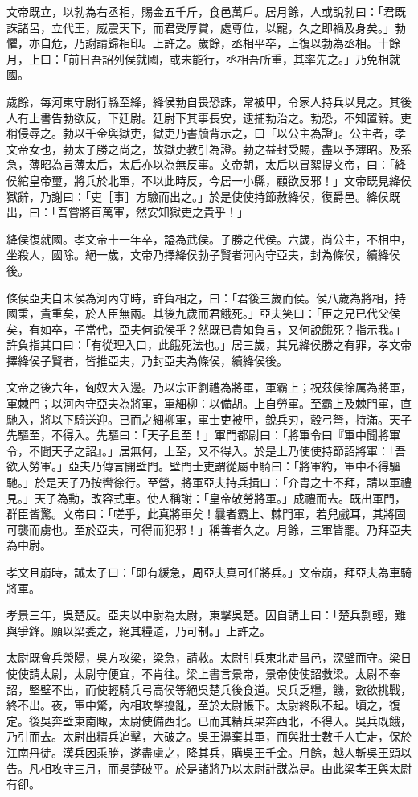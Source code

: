 \begin{pinyinscope}
文帝既立，以勃為右丞相，賜金五千斤，食邑萬戶。居月餘，人或說勃曰：「君既誅諸呂，立代王，威震天下，而君受厚賞，處尊位，以寵，久之即禍及身矣。」勃懼，亦自危，乃謝請歸相印。上許之。歲餘，丞相平卒，上復以勃為丞相。十餘月，上曰：「前日吾詔列侯就國，或未能行，丞相吾所重，其率先之。」乃免相就國。

歲餘，每河東守尉行縣至絳，絳侯勃自畏恐誅，常被甲，令家人持兵以見之。其後人有上書告勃欲反，下廷尉。廷尉下其事長安，逮捕勃治之。勃恐，不知置辭。吏稍侵辱之。勃以千金與獄吏，獄吏乃書牘背示之，曰「以公主為證」。公主者，孝文帝女也，勃太子勝之尚之，故獄吏教引為證。勃之益封受賜，盡以予薄昭。及系急，薄昭為言薄太后，太后亦以為無反事。文帝朝，太后以冒絮提文帝，曰：「絳侯綰皇帝璽，將兵於北軍，不以此時反，今居一小縣，顧欲反邪！」文帝既見絳侯獄辭，乃謝曰：「吏［事］方驗而出之。」於是使使持節赦絳侯，復爵邑。絳侯既出，曰：「吾嘗將百萬軍，然安知獄吏之貴乎！」

絳侯復就國。孝文帝十一年卒，謚為武侯。子勝之代侯。六歲，尚公主，不相中，坐殺人，國除。絕一歲，文帝乃擇絳侯勃子賢者河內守亞夫，封為條侯，續絳侯後。

條侯亞夫自未侯為河內守時，許負相之，曰：「君後三歲而侯。侯八歲為將相，持國秉，貴重矣，於人臣無兩。其後九歲而君餓死。」亞夫笑曰：「臣之兄已代父侯矣，有如卒，子當代，亞夫何說侯乎？然既已貴如負言，又何說餓死？指示我。」許負指其口曰：「有從理入口，此餓死法也。」居三歲，其兄絳侯勝之有罪，孝文帝擇絳侯子賢者，皆推亞夫，乃封亞夫為條侯，續絳侯後。

文帝之後六年，匈奴大入邊。乃以宗正劉禮為將軍，軍霸上；祝茲侯徐厲為將軍，軍棘門；以河內守亞夫為將軍，軍細柳：以備胡。上自勞軍。至霸上及棘門軍，直馳入，將以下騎送迎。已而之細柳軍，軍士吏被甲，銳兵刃，彀弓弩，持滿。天子先驅至，不得入。先驅曰：「天子且至！」軍門都尉曰：「將軍令曰『軍中聞將軍令，不聞天子之詔』。」居無何，上至，又不得入。於是上乃使使持節詔將軍：「吾欲入勞軍。」亞夫乃傳言開壁門。壁門士吏謂從屬車騎曰：「將軍約，軍中不得驅馳。」於是天子乃按轡徐行。至營，將軍亞夫持兵揖曰：「介胄之士不拜，請以軍禮見。」天子為動，改容式車。使人稱謝：「皇帝敬勞將軍。」成禮而去。既出軍門，群臣皆驚。文帝曰：「嗟乎，此真將軍矣！曩者霸上、棘門軍，若兒戲耳，其將固可襲而虜也。至於亞夫，可得而犯邪！」稱善者久之。月餘，三軍皆罷。乃拜亞夫為中尉。

孝文且崩時，誡太子曰：「即有緩急，周亞夫真可任將兵。」文帝崩，拜亞夫為車騎將軍。

孝景三年，吳楚反。亞夫以中尉為太尉，東擊吳楚。因自請上曰：「楚兵剽輕，難與爭鋒。願以梁委之，絕其糧道，乃可制。」上許之。

太尉既會兵滎陽，吳方攻梁，梁急，請救。太尉引兵東北走昌邑，深壁而守。梁日使使請太尉，太尉守便宜，不肯往。梁上書言景帝，景帝使使詔救梁。太尉不奉詔，堅壁不出，而使輕騎兵弓高侯等絕吳楚兵後食道。吳兵乏糧，饑，數欲挑戰，終不出。夜，軍中驚，內相攻擊擾亂，至於太尉帳下。太尉終臥不起。頃之，復定。後吳奔壁東南陬，太尉使備西北。已而其精兵果奔西北，不得入。吳兵既餓，乃引而去。太尉出精兵追擊，大破之。吳王濞棄其軍，而與壯士數千人亡走，保於江南丹徒。漢兵因乘勝，遂盡虜之，降其兵，購吳王千金。月餘，越人斬吳王頭以告。凡相攻守三月，而吳楚破平。於是諸將乃以太尉計謀為是。由此梁孝王與太尉有卻。


\end{pinyinscope}
